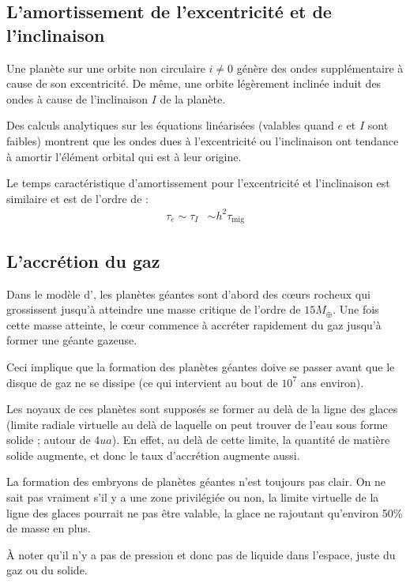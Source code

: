 \subsection{L'amortissement de l'excentricité et de l'inclinaison}%
Une planète sur une orbite non circulaire $i\neq 0$ génère des ondes supplémentaire à cause de son excentricité. De même, une orbite légèrement inclinée induit des ondes à cause de l'inclinaison $I$ de la planète. 

Des calculs analytiques sur les équations linéarisées (valables quand $e$ et $I$ sont faibles) montrent que les ondes dues à l'excentricité ou l'inclinaison ont tendance à amortir l'élément orbital qui est à leur origine. 

Le temps caractéristique d'amortissement pour l'excentricité et l'inclinaison est similaire et est de l'ordre de \citep{tanaka2004three} :
\begin{align}
\tau_e \sim \tau_I &\sim h^2 \tau_\text{mig}
\end{align}


\subsection{L'accrétion du gaz}\label{sec:accretion_coeur}
Dans le modèle d', les planètes géantes sont d'abord des c\oe urs rocheux qui grossissent jusqu'à atteindre une masse critique de l'ordre de $15 M_{\oplus}$. Une fois cette masse atteinte, le c\oe ur commence à accréter rapidement du gaz jusqu'à former une géante gazeuse.

Ceci implique que la formation des planètes géantes doive se passer avant que le disque de gaz ne se dissipe (ce qui intervient au bout de $10^7$ ans environ).

Les noyaux de ces planètes sont supposés se former au delà de la ligne des glaces (limite radiale virtuelle au delà de laquelle on peut trouver de l'eau sous forme solide ; autour de $4\unit{ua}$). En effet, au delà de cette limite, la quantité de matière solide augmente, et donc le taux d'accrétion augmente aussi.

\begin{attention}
La formation des embryons de planètes géantes n'est toujours pas clair. On ne sait pas vraiment s'il y a une zone privilégiée ou non, la limite virtuelle de la ligne des glaces pourrait ne pas être valable, la glace ne rajoutant qu'environ 50\% de masse en plus.

À noter qu'il n'y a pas de pression et donc pas de liquide dans l'espace, juste du gaz ou du solide.
\end{attention}

